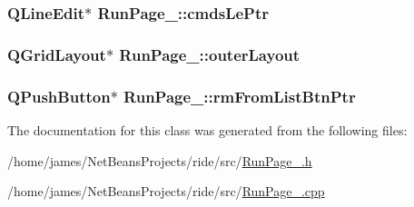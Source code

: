\hypertarget{class_run_page__3_a9feed842f177140df74c6194851114ad}{
\subsubsection[{cmds\-Le\-Ptr}]{\setlength{\rightskip}{0pt plus 5cm}Q\-Line\-Edit$\ast$ Run\-Page\-\_\-::cmds\-Le\-Ptr\hspace{0.3cm}{\ttfamily [private]}}}\label{class_run_page__3_a9feed842f177140df74c6194851114ad}
\hypertarget{class_run_page__3_a8ca3e66cc9b6534b06341d507a7bea4b}{
\subsubsection[{outer\-Layout}]{\setlength{\rightskip}{0pt plus 5cm}Q\-Grid\-Layout$\ast$ Run\-Page\-\_\-::outer\-Layout\hspace{0.3cm}{\ttfamily [private]}}}\label{class_run_page__3_a8ca3e66cc9b6534b06341d507a7bea4b}
\hypertarget{class_run_page__3_ae38727316495817c8bead962171f0bc7}{
\subsubsection[{rm\-From\-List\-Btn\-Ptr}]{\setlength{\rightskip}{0pt plus 5cm}Q\-Push\-Button$\ast$ Run\-Page\-\_\-::rm\-From\-List\-Btn\-Ptr\hspace{0.3cm}{\ttfamily [private]}}}\label{class_run_page__3_ae38727316495817c8bead962171f0bc7}


The documentation for this class was generated from the following files\-:\begin{DoxyCompactItemize}
\item 
/home/james/\-Net\-Beans\-Projects/ride/src/\hyperlink{_run_page__3_8h}{Run\-Page\-\_.\-h}\item 
/home/james/\-Net\-Beans\-Projects/ride/src/\hyperlink{_run_page__3_8cpp}{Run\-Page\-\_.\-cpp}\end{DoxyCompactItemize}
